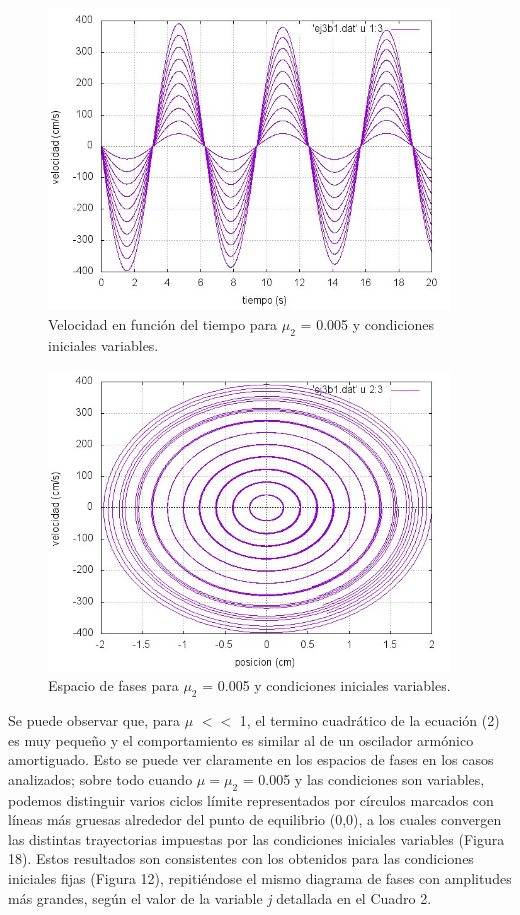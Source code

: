 \documentclass[a4paper,12pt]{article}
\begin{document}
\begin{itemize}
\begin{figure}[H]
\begin{center}
\includegraphics[height=8cm]{grafico_ej3b1_vVSt.jpg}
\caption[width=5cm]{Velocidad en funci\'on del tiempo para $\mu_2$ = 0.005 y condiciones iniciales variables.}
\end{center}
\end{figure}

\begin{figure}[H]
\begin{center}
\includegraphics[height=8cm]{grafico_ej3b1_xVSv.jpg}
\caption[width=5cm]{Espacio de fases para $\mu_2$ = 0.005 y condiciones iniciales variables.}
\end{center}
\end{figure}

Se puede observar que, para $\mu$ $<<$ 1, el termino cuadr\'atico de la ecuaci\'on (2) es muy peque\~no y el comportamiento es similar al de un oscilador arm\'onico amortiguado. Esto se puede ver claramente en los espacios de fases en los casos analizados; sobre todo cuando $\mu = \mu_2$ = 0.005 y las condiciones son variables, podemos distinguir varios ciclos l\'imite representados por c\'irculos marcados con l\'ineas m\'as gruesas alrededor del punto de equilibrio (0,0), a los cuales convergen las distintas trayectorias impuestas por las condiciones iniciales variables (Figura 18).
Estos resultados son consistentes con los obtenidos para las condiciones iniciales fijas (Figura 12), repiti\'endose el mismo diagrama de fases con amplitudes m\'as grandes, seg\'un el valor de la variable \textit{j} detallada en el Cuadro 2.




\end{itemize}
\end{document}

